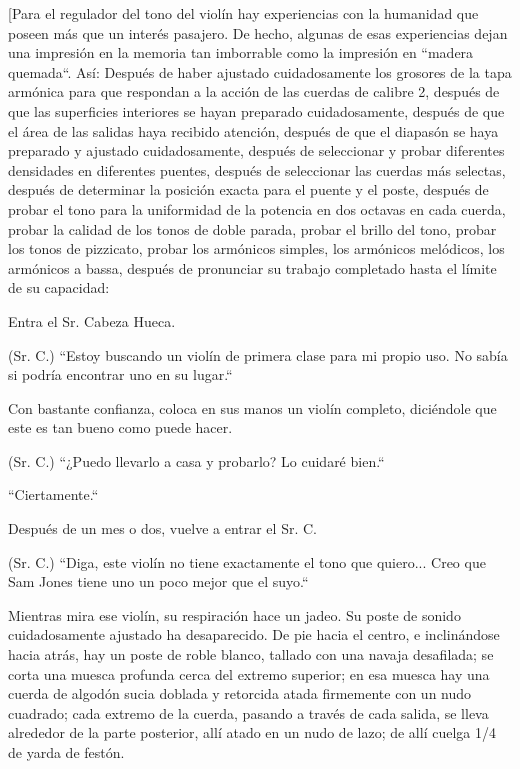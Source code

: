 \documentclass[12pt]{book}
\begin{document}
[Para el regulador del tono del violín hay experiencias con la humanidad que poseen más que un interés pasajero. De hecho, algunas de esas experiencias dejan una impresión en la memoria tan imborrable como la impresión en ``madera quemada``. Así: Después de haber ajustado cuidadosamente los grosores de la tapa armónica para que respondan a la acción de las cuerdas de calibre 2, después de que las superficies interiores se hayan preparado cuidadosamente, después de que el área de las salidas haya recibido atención, después de que el diapasón se haya preparado y ajustado cuidadosamente, después de seleccionar y probar diferentes densidades en diferentes puentes, después de seleccionar las cuerdas más selectas, después de determinar la posición exacta para el puente y el poste, después de probar el tono para la uniformidad de la potencia en dos octavas en cada cuerda, probar la calidad de los tonos de doble parada, probar el brillo del tono, probar los tonos de pizzicato, probar los armónicos simples, los armónicos melódicos, los armónicos a bassa, después de pronunciar su trabajo completado hasta el límite de su capacidad:

Entra el Sr. Cabeza Hueca.

(Sr. C.) ``Estoy buscando un violín de primera clase para mi propio uso. No sabía si podría encontrar uno en su lugar.``

Con bastante confianza, coloca en sus manos un violín completo, diciéndole que este es tan bueno como puede hacer.

(Sr. C.) ``¿Puedo llevarlo a casa y probarlo? Lo cuidaré bien.``

``Ciertamente.``

Después de un mes o dos, vuelve a entrar el Sr. C.

(Sr. C.) ``Diga, este violín no tiene exactamente el tono que quiero... Creo que Sam Jones tiene uno un poco mejor que el suyo.``

Mientras mira ese violín, su respiración hace un jadeo. Su poste de sonido cuidadosamente ajustado ha desaparecido. De pie hacia el centro, e inclinándose hacia atrás, hay un poste de roble blanco, tallado con una navaja desafilada; se corta una muesca profunda cerca del extremo superior; en esa muesca hay una cuerda de algodón sucia doblada y retorcida atada firmemente con un nudo cuadrado; cada extremo de la cuerda, pasando a través de cada salida, se lleva alrededor de la parte posterior, allí atado en un nudo de lazo; de allí cuelga 1/4 de yarda de festón.
\end{document}
